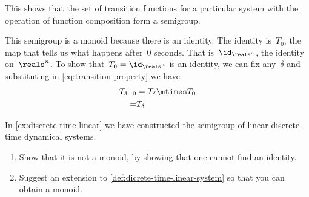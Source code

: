 \begin{example}
  This shows that the set of transition functions for a particular system with the operation of function composition form a semigroup.

  This semigroup is a monoid because there is an identity. The identity is~$T_0$, the map that tells us
  what happens after~$0$ seconds. That is~$\id_{\reals^n}$, the identity on~$\reals^n$.
  To show that~$T_0 = \id_{\reals^n}$ is an identity, we can fix any~$\delta$ and substituting in \cref{eq:transition-property} we have
  \begin{equation*}
    \begin{aligned}
      T_{\delta + 0}&= T_{\delta} \mtimes T_{0} \\
      = & T_{\delta}
    \end{aligned}
  \end{equation*}

\end{example}


\begin{exercise}
  In \cref{ex:discrete-time-linear} we have constructed the semigroup of linear discrete-time dynamical systems.

  \begin{enumerate}
    \item Show that it is not a monoid, by showing that one cannot find an identity.
    \item Suggest an extension to \cref{def:dicrete-time-linear-system} so that you can obtain a monoid.
  \end{enumerate}
\end{exercise}
\begin{solution}
\end{solution}

